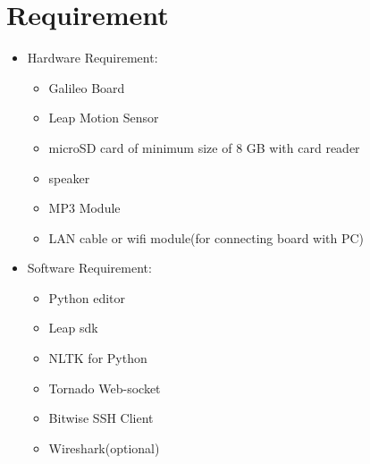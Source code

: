 \documentclass[11pt,a4paper]{article}
\begin{document}
	\section{Requirement}
	\vspace{1cm}
	\begin{itemize}
	    \item Hardware Requirement:
	    \begin{itemize}
	        \item Galileo Board
	        \item Leap Motion Sensor
	        \item microSD card of minimum size of 8 GB with card reader
	        \item speaker
	        \item MP3 Module
	        \item LAN cable or wifi module(for connecting board with PC)
	    \end{itemize}
	    \vspace{1cm}
	    \item Software Requirement:
	    \begin{itemize}
	        \item Python editor
	        \item Leap sdk
	        \item NLTK for Python
	        \item Tornado Web-socket
	        \item Bitwise SSH Client
	        \item Wireshark(optional)
	    \end{itemize}
	\end{itemize}
	\newpage
\end{document}
